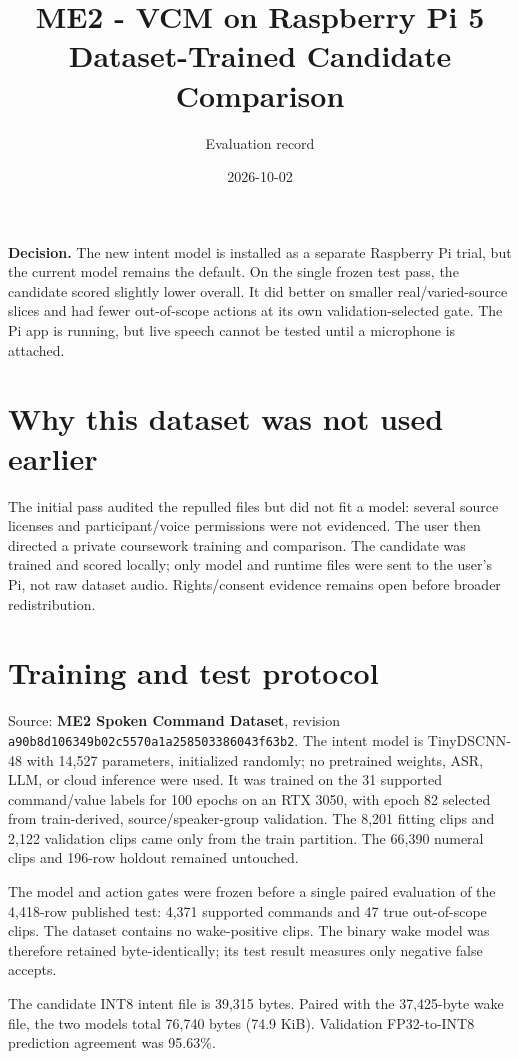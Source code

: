 \documentclass[10pt]{article}
\title{ME2 - VCM on Raspberry Pi 5\\[2pt]\large Dataset-Trained Candidate Comparison}
\author{Evaluation record}
\date{2026-10-02}
\begin{document}
\maketitle
\vspace{-1.2em}

\textbf{Decision.} The new intent model is installed as a separate Raspberry Pi trial, but the current model remains the default. On the single frozen test pass, the candidate scored slightly lower overall. It did better on smaller real/varied-source slices and had fewer out-of-scope actions at its own validation-selected gate. The Pi app is running, but live speech cannot be tested until a microphone is attached.

\section*{Why this dataset was not used earlier}
The initial pass audited the repulled files but did not fit a model: several source licenses and participant/voice permissions were not evidenced. The user then directed a private coursework training and comparison. The candidate was trained and scored locally; only model and runtime files were sent to the user's Pi, not raw dataset audio. Rights/consent evidence remains open before broader redistribution.

\section*{Training and test protocol}
Source: \textbf{ME2 Spoken Command Dataset}, revision \texttt{a90b8d106349b02c5570a1a258503386043f63b2}. The intent model is TinyDSCNN-48 with 14,527 parameters, initialized randomly; no pretrained weights, ASR, LLM, or cloud inference were used. It was trained on the 31 supported command/value labels for 100 epochs on an RTX 3050, with epoch 82 selected from train-derived, source/speaker-group validation. The 8,201 fitting clips and 2,122 validation clips came only from the train partition. The 66,390 numeral clips and 196-row holdout remained untouched.

The model and action gates were frozen before a single paired evaluation of the 4,418-row published test: 4,371 supported commands and 47 true out-of-scope clips. The dataset contains no wake-positive clips. The binary wake model was therefore retained byte-identically; its test result measures only negative false accepts.

The candidate INT8 intent file is 39,315 bytes. Paired with the 37,425-byte wake file, the two models total 76,740 bytes (74.9 KiB). Validation FP32-to-INT8 prediction agreement was 95.63\%.
\end{document}
